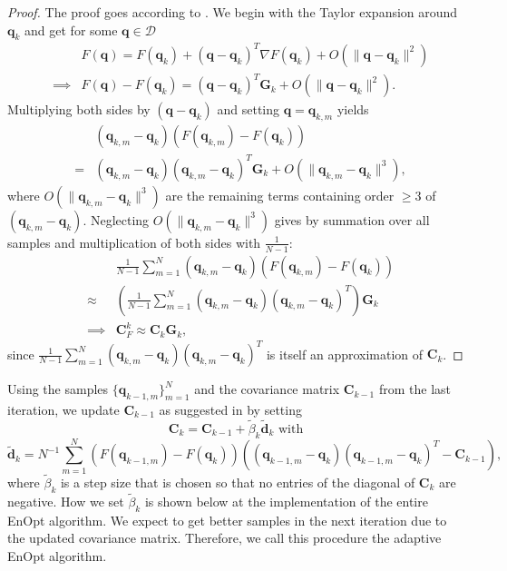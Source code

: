 \begin{proof}
The proof goes according to \cite{OGUNTOLA2021109165}. We begin with the Taylor expansion around $\mathbf{q}_k$ and get for some $\mathbf{q}\in\mathcal{D}$
\begin{eqnarray*}
&&F(\mathbf{q})=F(\mathbf{q}_k)+(\mathbf{q}-\mathbf{q}_k)^T\nabla F(\mathbf{q}_k)+O(\|\mathbf{q}-\mathbf{q}_k\|^2)\\
&\implies&F(\mathbf{q})-F(\mathbf{q}_k)=(\mathbf{q}-\mathbf{q}_k)^T\mathbf{G}_k+O(\|\mathbf{q}-\mathbf{q}_k\|^2).
\end{eqnarray*}
Multiplying both sides by $(\mathbf{q}-\mathbf{q}_k)$ and setting $\mathbf{q}=\mathbf{q}_{k,m}$ yields
\begin{eqnarray*}
&&(\mathbf{q}_{k,m}-\mathbf{q}_k)(F(\mathbf{q}_{k,m})-F(\mathbf{q}_k))\\
&=&(\mathbf{q}_{k,m}-\mathbf{q}_k)(\mathbf{q}_{k,m}-\mathbf{q}_k)^T\mathbf{G}_k+O(\|\mathbf{q}_{k,m}-\mathbf{q}_k\|^3),
\end{eqnarray*}
where $O(\|\mathbf{q}_{k,m}-\mathbf{q}_k\|^3)$ are the remaining terms containing order $\geq3$ of $(\mathbf{q}_{k,m}-\mathbf{q}_k)$. Neglecting $O(\|\mathbf{q}_{k,m}-\mathbf{q}_k\|^3)$ gives by summation over all samples and multiplication of both sides with $\frac{1}{N-1}$:
\begin{eqnarray*}
&&\frac{1}{N-1}\sum_{m=1}^N(\mathbf{q}_{k,m}-\mathbf{q}_k)(F(\mathbf{q}_{k,m})-F(\mathbf{q}_k))\\
&\approx&\left(\frac{1}{N-1}\sum_{m=1}^N(\mathbf{q}_{k,m}-\mathbf{q}_k)(\mathbf{q}_{k,m}-\mathbf{q}_k)^T\right)\mathbf{G}_k\\
&\implies&\mathbf{C}_F^k\approx\mathbf{C}_k\mathbf{G}_k,
\end{eqnarray*}
since $\frac{1}{N-1}\sum_{m=1}^N(\mathbf{q}_{k,m}-\mathbf{q}_k)(\mathbf{q}_{k,m}-\mathbf{q}_k)^T$ is itself an approximation of $\mathbf{C}_k$.
\end{proof}

Using the samples $\{\mathbf{q}_{k-1,m}\}_{m=1}^N$ and the covariance matrix $\mathbf{C}_{k-1}$ from the last iteration, we update $\mathbf{C}_{k-1}$ as suggested in \cite{Stordal2016-cj} by setting
\begin{equation}
\label{updateCov}
\mathbf{C}_k=\mathbf{C}_{k-1}+\tilde{\beta}_k\tilde{\mathbf{d}}_k\text{ with}
\end{equation}
\begin{equation}
\label{updateCovDirection}
\tilde{\mathbf{d}}_k=N^{-1}\sum_{m=1}^N(F(\mathbf{q}_{k-1,m})-F(\mathbf{q}_k))((\mathbf{q}_{k-1,m}-\mathbf{q}_k)(\mathbf{q}_{k-1,m}-\mathbf{q}_k)^T-\mathbf{C}_{k-1}),
\end{equation}
where $\tilde{\beta}_k$ is a step size that is chosen so that no entries of the diagonal of $\mathbf{C}_k$ are negative. How we set $\tilde{\beta}_k$ is shown below at the implementation of the entire EnOpt algorithm. We expect to get better samples in the next iteration due to the updated covariance matrix. Therefore, we call this procedure the adaptive EnOpt algorithm.

